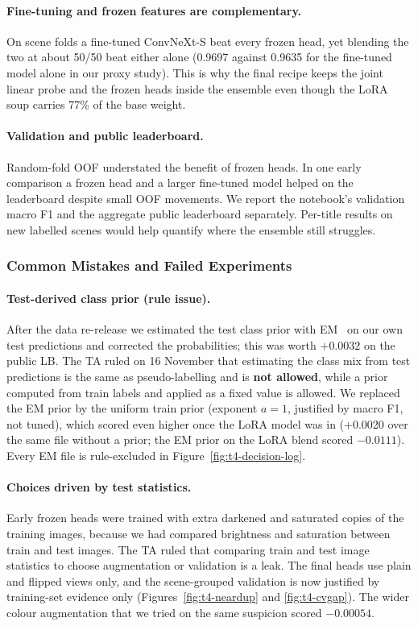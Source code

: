 \documentclass[../main.tex]{subfiles}
\begin{document}
\paragraph{Fine-tuning and frozen features are complementary.} On scene folds a fine-tuned ConvNeXt-S beat every frozen head, yet blending the two at about 50/50 beat either alone (0.9697 against 0.9635 for the fine-tuned model alone in our proxy study). This is why the final recipe keeps the joint linear probe and the frozen heads inside the ensemble even though the LoRA soup carries 77\% of the base weight.

\paragraph{Validation and public leaderboard.} Random-fold OOF understated the benefit of frozen heads. In one early comparison a frozen head and a larger fine-tuned model helped on the leaderboard despite small OOF movements. We report the notebook's validation macro F1 and the aggregate public leaderboard separately. Per-title results on new labelled scenes would help quantify where the ensemble still struggles.

\subsubsection{Common Mistakes and Failed Experiments}

\paragraph{Test-derived class prior (rule issue).} After the data re-release we estimated the test class prior with EM~\citep{saerens} on our own test predictions and corrected the probabilities; this was worth $+0.0032$ on the public LB. The TA ruled on 16 November that estimating the class mix from test predictions is the same as pseudo-labelling and is \textbf{not allowed}, while a prior computed from train labels and applied as a fixed value is allowed. We replaced the EM prior by the uniform train prior (exponent $a=1$, justified by macro F1, not tuned), which scored even higher once the LoRA model was in (+0.0020 over the same file without a prior; the EM prior on the LoRA blend scored $-0.0111$). Every EM file is rule-excluded in Figure~\ref{fig:t4-decision-log}.

\paragraph{Choices driven by test statistics.} Early frozen heads were trained with extra darkened and saturated copies of the training images, because we had compared brightness and saturation between train and test images. The TA ruled that comparing train and test image statistics to choose augmentation or validation is a leak. The final heads use plain and flipped views only, and the scene-grouped validation is now justified by training-set evidence only (Figures~\ref{fig:t4-neardup} and \ref{fig:t4-cvgap}). The wider colour augmentation that we tried on the same suspicion scored $-0.00054$.
\end{document}
